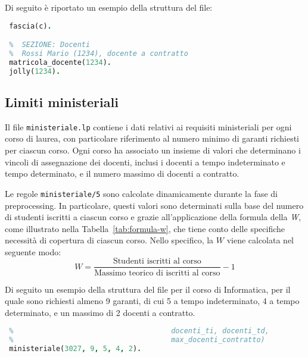 Di seguito è riportato un esempio della struttura del file:

\begin{lstlisting}[language=prolog, caption={Esempio struttura dati di \texttt{docenti\_a\_contratto.lp}.}]    
 %  SEZIONE: FASCIE
 fascia(c).

 %  SEZIONE: Docenti
 %  Rossi Mario (1234), docente a contratto
 matricola_docente(1234).
 jolly(1234).
\end{lstlisting}


\subsection{Limiti ministeriali}\label{sec:rules-ministeriale}

Il file \texttt{ministeriale.lp} contiene i dati relativi ai requisiti ministeriali per 
ogni corso di laurea, con particolare riferimento al numero minimo di garanti richiesti 
per ciascun corso. Ogni corso ha associato un insieme di valori che determinano i vincoli 
di assegnazione dei docenti, inclusi i docenti a tempo indeterminato e tempo determinato,
e il numero massimo di docenti a contratto.

Le regole \texttt{ministeriale/5} sono calcolate dinamicamente durante la fase di 
preprocessing. In particolare, questi valori sono determinati sulla base del numero di 
studenti iscritti a ciascun corso e grazie all'applicazione della formula della \textit{W}, 
come illustrato nella Tabella~\ref{tab:formula-w}, che tiene conto delle specifiche 
necessità di copertura di ciascun corso. Nello specifico, la $W$ viene calcolata nel 
seguente modo:
$$
W = \frac{
        \text{Studenti iscritti al corso}
    }
    {
        \text{Massimo teorico di iscritti al corso}
    }
    - 1
$$

Di seguito un esempio della struttura del file per il corso di Informatica, per 
il quale sono richiesti almeno 9 garanti, di cui 5 a tempo indeterminato, 4 a tempo 
determinato, e un massimo di 2 docenti a contratto. 

\begin{lstlisting}[language=prolog, caption={Esempio struttura dati di \texttt{ministeriale.lp}.}]    
 %  SEZIONE: Garanti minimi per corso (codice_corso, minimo_complessivo, 
 %                                     docenti_ti, docenti_td, 
 %                                     max_docenti_contratto)
 ministeriale(3027, 9, 5, 4, 2).
\end{lstlisting} 

